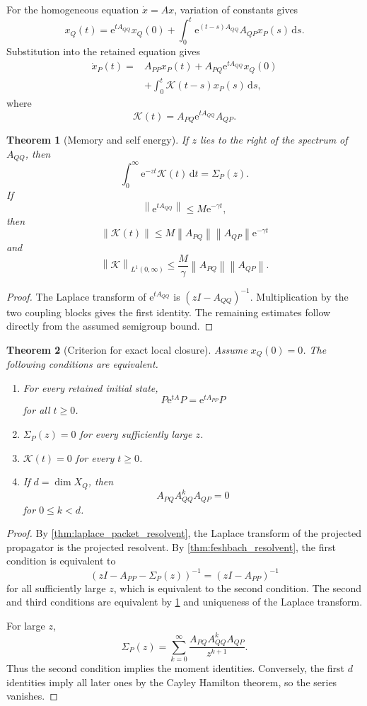\documentclass{aomart}
\newtheorem{theorem}{Theorem}[section]
\theoremstyle{definition}
\theoremstyle{remark}
\newcommand{\Kcal}{\mathcal K}
\newcommand{\e}{\mathrm e}
\newcommand{\dd}{\,\mathrm d}
\newcommand{\norm}[1]{\left\lVert#1\right\rVert}
\begin{document}
For the homogeneous equation \(\dot x=Ax\), variation of constants gives
\[
x_Q(t)
=
\e^{tA_{QQ}}x_Q(0)
+
\int_0^t
\e^{(t-s)A_{QQ}}A_{QP}x_P(s)
\dd s.
\]
Substitution into the retained equation gives
\[
\begin{aligned}
\dot x_P(t)
={}&
A_{PP}x_P(t)
+
A_{PQ}\e^{tA_{QQ}}x_Q(0)\\
&+
\int_0^t
\Kcal(t-s)x_P(s)
\dd s,
\end{aligned}
\]
where
\[
\Kcal(t)
=
A_{PQ}\e^{tA_{QQ}}A_{QP}.
\]

\begin{theorem}[Memory and self energy]\label{thm:memory_self_energy}
If \(z\) lies to the right of the spectrum of \(A_{QQ}\), then
\[
\int_0^\infty
\e^{-zt}\Kcal(t)\dd t
=
\Sigma_P(z).
\]
If
\[
\norm{\e^{tA_{QQ}}}
\leq
M\e^{-\gamma t},
\]
then
\[
\norm{\Kcal(t)}
\leq
M\norm{A_{PQ}}\norm{A_{QP}}\e^{-\gamma t}
\]
and
\[
\norm{\Kcal}_{L^1(0,\infty)}
\leq
\frac{M}{\gamma}
\norm{A_{PQ}}\norm{A_{QP}}.
\]
\end{theorem}

\begin{proof}
The Laplace transform of \(\e^{tA_{QQ}}\) is \((zI-A_{QQ})^{-1}\). Multiplication by the two coupling blocks gives the first identity. The remaining estimates follow directly from the assumed semigroup bound.
\end{proof}

\begin{theorem}[Criterion for exact local closure]\label{thm:local_closure}
Assume \(x_Q(0)=0\). The following conditions are equivalent.
\begin{enumerate}
\item For every retained initial state,
\[
P\e^{tA}P
=
\e^{tA_{PP}}P
\]
for all \(t\geq0\).
\item \(\Sigma_P(z)=0\) for every sufficiently large \(z\).
\item \(\Kcal(t)=0\) for every \(t\geq0\).
\item If \(d=\dim X_Q\), then
\[
A_{PQ}A_{QQ}^kA_{QP}=0
\]
for \(0\leq k<d\).
\end{enumerate}
\end{theorem}

\begin{proof}
By \cref{thm:laplace_packet_resolvent}, the Laplace transform of the projected propagator is the projected resolvent. By \cref{thm:feshbach_resolvent}, the first condition is equivalent to
\[
(zI-A_{PP}-\Sigma_P(z))^{-1}
=
(zI-A_{PP})^{-1}
\]
for all sufficiently large \(z\), which is equivalent to the second condition. The second and third conditions are equivalent by \cref{thm:memory_self_energy} and uniqueness of the Laplace transform.

For large \(z\),
\[
\Sigma_P(z)
=
\sum_{k=0}^{\infty}
\frac{A_{PQ}A_{QQ}^kA_{QP}}{z^{k+1}}.
\]
Thus the second condition implies the moment identities. Conversely, the first \(d\) identities imply all later ones by the Cayley Hamilton theorem, so the series vanishes.
\end{proof}
\end{document}
